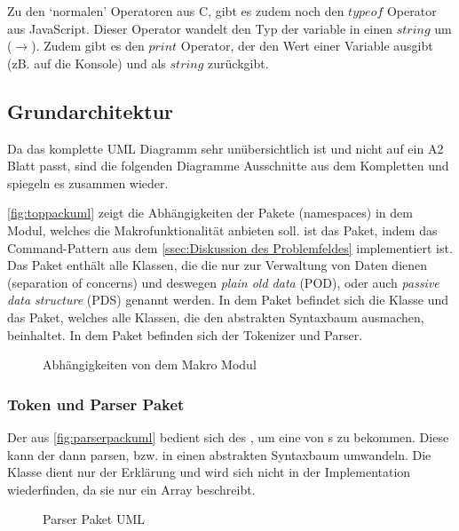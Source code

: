 {      Zu den `normalen' Operatoren aus C, gibt es zudem noch den \myMIn$typeof$ Operator aus JavaScript. Dieser Operator wandelt den Typ der variable in einen \myMIn$string$ um ($\rightarrow$). Zudem gibt es den \myMIn$print$ Operator, der den Wert einer Variable ausgibt (zB. auf die Konsole) und als \myMIn$string$ zurückgibt.

  \subsection{Grundarchitektur}
  \label{ssec:Grundarchitektur}
    Da das komplette UML Diagramm sehr unübersichtlich ist und nicht auf ein A2 Blatt passt, sind die folgenden Diagramme Ausschnitte aus dem Kompletten und spiegeln es zusammen wieder.

    \autoref{fig:toppackuml} zeigt die Abhängigkeiten der Pakete (namespaces) in dem Modul, welches die Makrofunktionalität anbieten soll.  ist das Paket, indem das Command-Pattern aus dem \autoref{ssec:Diskussion des Problemfeldes} implementiert ist. Das  Paket enthält alle Klassen, die die nur zur Verwaltung von Daten dienen (separation of concerns) und deswegen \emph{plain old data} (POD), oder auch \emph{passive data structure} (PDS) genannt werden. In dem  Paket befindet sich die  Klasse und das  Paket, welches alle Klassen, die den abstrakten Syntaxbaum ausmachen, beinhaltet. In dem  Paket befinden sich der Tokenizer und Parser.
    \begin{figure}[H]
      \centering
      \caption{Abhängigkeiten von dem Makro Modul}
      \label{fig:toppackuml}
    \end{figure}

    \subsubsection{Token und Parser Paket}
    \label{sssec:Token und Parser Paket}
      Der  aus \autoref{fig:parserpackuml} bedient sich des , um eine  von s zu bekommen. Diese  kann der  dann parsen, bzw. in einen abstrakten Syntaxbaum umwandeln. Die  Klasse dient nur der Erklärung und wird sich nicht in der Implementation wiederfinden, da sie nur ein Array beschreibt.
      \begin{figure}[H]
        \centering
        \caption{Parser Paket UML}
        \label{fig:parserpackuml}
      \end{figure}

}
